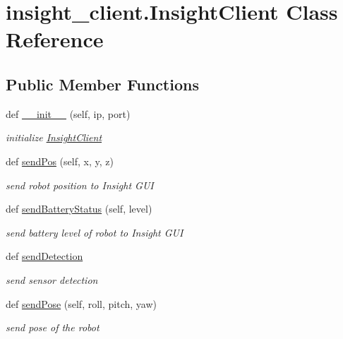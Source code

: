 \hypertarget{classinsight__client_1_1InsightClient}{}\section{insight\+\_\+client.\+Insight\+Client Class Reference}
\label{classinsight__client_1_1InsightClient}
\subsection*{Public Member Functions}
\begin{DoxyCompactItemize}
\item 
def \hyperlink{classinsight__client_1_1InsightClient_a6ce2fb5655f85532583d4984f2c6f3da}{\+\_\+\+\_\+init\+\_\+\+\_\+} (self, ip, port)
\begin{DoxyCompactList}\small\item\em initialize \hyperlink{classinsight__client_1_1InsightClient}{Insight\+Client} \end{DoxyCompactList}\item 
def \hyperlink{classinsight__client_1_1InsightClient_a341da3412de138de10607a93656c4e49}{send\+Pos} (self, x, y, z)
\begin{DoxyCompactList}\small\item\em send robot position to Insight G\+U\+I \end{DoxyCompactList}\item 
def \hyperlink{classinsight__client_1_1InsightClient_a9b03273a011db2d6c88be123206fe975}{send\+Battery\+Status} (self, level)
\begin{DoxyCompactList}\small\item\em send battery level of robot to Insight G\+U\+I \end{DoxyCompactList}\item 
def \hyperlink{classinsight__client_1_1InsightClient_a1687ed68fdf32c05c179a5226df7a8b4}{send\+Detection}
\begin{DoxyCompactList}\small\item\em send sensor detection \end{DoxyCompactList}\item 
def \hyperlink{classinsight__client_1_1InsightClient_aa4784fd79c440fc87674dc1e1c76bb35}{send\+Pose} (self, roll, pitch, yaw)
\begin{DoxyCompactList}\small\item\em send pose of the robot \end{DoxyCompactList}\item 

\end{DoxyCompactItemize}
